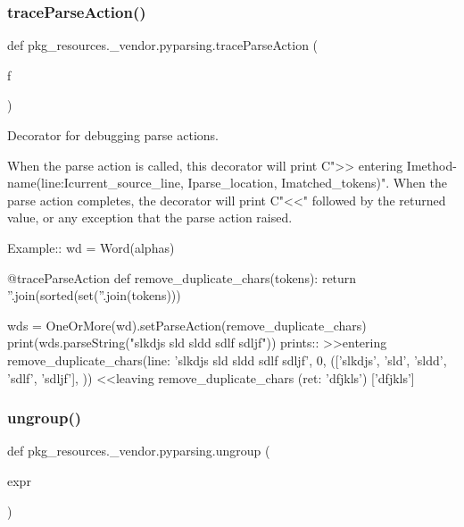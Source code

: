 \subsubsection{\texorpdfstring{trace\+Parse\+Action()}{traceParseAction()}}
{\footnotesize\ttfamily def pkg\+\_\+resources.\+\_\+vendor.\+pyparsing.\+trace\+Parse\+Action (\begin{DoxyParamCaption}\item[{}]{f }\end{DoxyParamCaption})}

\begin{DoxyVerb}Decorator for debugging parse actions. 

When the parse action is called, this decorator will print C{">> entering I{method-name}(line:I{current_source_line}, I{parse_location}, I{matched_tokens})".}
When the parse action completes, the decorator will print C{"<<"} followed by the returned value, or any exception that the parse action raised.

Example::
    wd = Word(alphas)

    @traceParseAction
    def remove_duplicate_chars(tokens):
        return ''.join(sorted(set(''.join(tokens)))

    wds = OneOrMore(wd).setParseAction(remove_duplicate_chars)
    print(wds.parseString("slkdjs sld sldd sdlf sdljf"))
prints::
    >>entering remove_duplicate_chars(line: 'slkdjs sld sldd sdlf sdljf', 0, (['slkdjs', 'sld', 'sldd', 'sdlf', 'sdljf'], {}))
    <<leaving remove_duplicate_chars (ret: 'dfjkls')
    ['dfjkls']
\end{DoxyVerb}
 \mbox{\label{namespacepkg__resources_1_1__vendor_1_1pyparsing_ab781c23a28afbeaa57480951e9d07217}} 
\subsubsection{\texorpdfstring{ungroup()}{ungroup()}}
{\footnotesize\ttfamily def pkg\+\_\+resources.\+\_\+vendor.\+pyparsing.\+ungroup (\begin{DoxyParamCaption}\item[{}]{expr }\end{DoxyParamCaption})}

